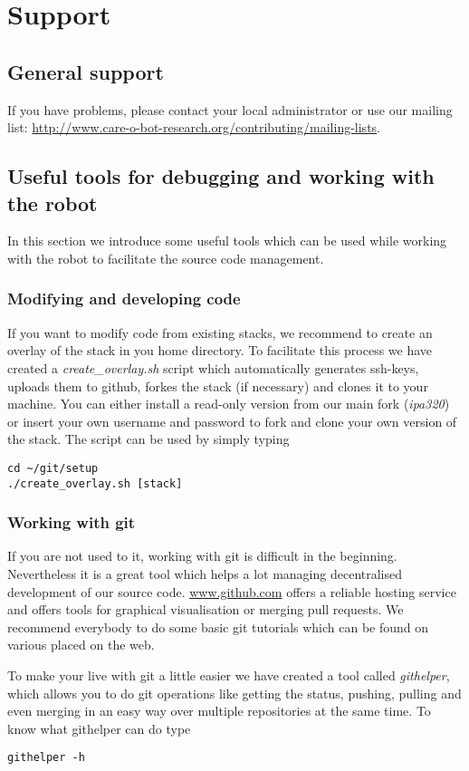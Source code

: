 \chapter{Support}\label{chap:support}
\section{General support}
If you have problems, please contact your local administrator or use our mailing list: \url{http://www.care-o-bot-research.org/contributing/mailing-lists}.

\section{Useful tools for debugging and working with the robot}
In this section we introduce some useful tools which can be used while working with the robot to facilitate the source code management.

\subsection{Modifying and developing code}
If you want to modify code from existing stacks, we recommend to create an overlay of the stack in you home directory. To facilitate this process we have created a \textit{create\_overlay.sh} script which automatically generates ssh-keys, uploads them to github, forkes the stack (if necessary) and clones it to your machine. You can either install a read-only version from our main fork (\textit{ipa320}) or insert your own username and password to fork and clone your own version of the stack. The script can be used by simply typing
\begin{lstlisting}
cd ~/git/setup
./create_overlay.sh [stack]
\end{lstlisting}

\subsection{Working with git}
If you are not used to it, working with git is difficult in the beginning. Nevertheless it is a great tool which helps a lot managing decentralised development of our source code. \url{www.github.com} offers a reliable hosting service and offers tools for graphical visualisation or merging pull requests. We recommend everybody to do some basic git tutorials which can be found on various placed on the web.

To make your live with git a little easier we have created a tool called \textit{githelper}, which allows you to do git operations like getting the status, pushing, pulling and even merging in an easy way over multiple repositories at the same time. To know what githelper can do type
\begin{lstlisting}
githelper -h
\end{lstlisting}

